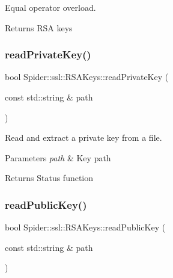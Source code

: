 Equal operator overload. 

\begin{DoxyReturn}{Returns}
R\+SA keys 
\end{DoxyReturn}
\mbox{\label{class_spider_1_1ssl_1_1_r_s_a_keys_a9d177902b9051cd1b064b6597f3a3697}} 
\subsubsection{\texorpdfstring{read\+Private\+Key()}{readPrivateKey()}}
{\footnotesize\ttfamily bool Spider\+::ssl\+::\+R\+S\+A\+Keys\+::read\+Private\+Key (\begin{DoxyParamCaption}\item[{const std\+::string \&}]{path }\end{DoxyParamCaption})}



Read and extract a private key from a file. 


\begin{DoxyParams}{Parameters}
{\em path} & Key path \\
\hline
\end{DoxyParams}
\begin{DoxyReturn}{Returns}
Status function 
\end{DoxyReturn}
\mbox{\label{class_spider_1_1ssl_1_1_r_s_a_keys_ae9702fe70c7ec6ef761995dd0fbb6abf}} 
\subsubsection{\texorpdfstring{read\+Public\+Key()}{readPublicKey()}}
{\footnotesize\ttfamily bool Spider\+::ssl\+::\+R\+S\+A\+Keys\+::read\+Public\+Key (\begin{DoxyParamCaption}\item[{const std\+::string \&}]{path }\end{DoxyParamCaption})}



